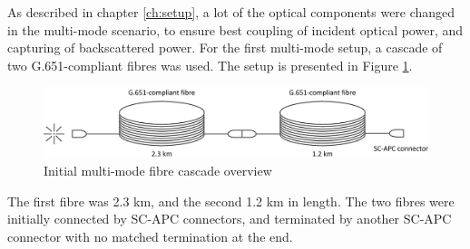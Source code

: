 \documentclass{standalone}
\begin{document}
As described in chapter \ref{ch:setup}, a lot of the optical components were changed in the multi-mode scenario, to ensure best coupling of incident optical power, and capturing of backscattered power. For the first multi-mode setup, a cascade of two G.651-compliant fibres was used. The setup is presented in Figure \ref{fig:mmf_first_cascade}.
\begin{figure}[h]
	\centering
	\includegraphics[width=\textwidth]{mmf_first_cascade.png}
	\caption{Initial multi-mode fibre cascade overview}
	\label{fig:mmf_first_cascade}
\end{figure}
The first fibre was 2.3 km, and the second 1.2 km in length. The two fibres were initially connected by SC-APC connectors, and terminated by another SC-APC connector with no matched termination at the end. \\
\end{document}
